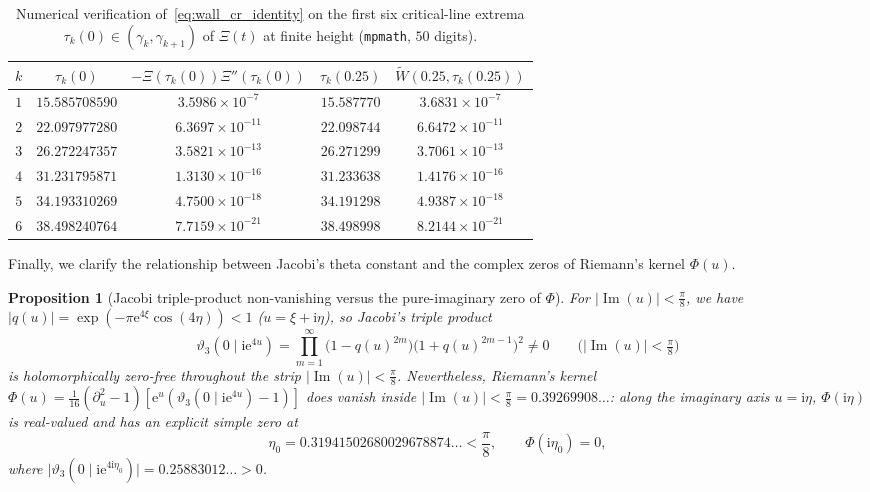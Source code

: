 \documentclass[11pt,reqno]{amsart}
\theoremstyle{plain}
\newtheorem{proposition}[theorem]{Proposition}
\theoremstyle{definition}
\theoremstyle{remark}
\numberwithin{equation}{section}
\newcommand{\ii}{\mathrm{i}}
\newcommand{\ee}{\mathrm{e}}
\DeclareMathOperator{\Imop}{Im}
\begin{document}
\begin{table}[htbp]
\centering
\caption{Numerical verification of~\eqref{eq:wall_cr_identity} on the first six critical-line extrema $\tau_k(0) \in (\gamma_k, \gamma_{k+1})$ of $\Xi(t)$ at finite height (\texttt{mpmath}, $50$ digits).}\label{tab:walls}
\small
\begin{tabular}{@{}ccccc@{}}
\toprule
$k$ & $\tau_k(0)$ & $-\Xi(\tau_k(0))\Xi''(\tau_k(0))$ & $\tau_k(0.25)$ & $\widetilde{W}(0.25, \tau_k(0.25))$ \\
\midrule
$1$ & $15.585708590$ & $3.5986 \times 10^{-7}$  & $15.587770$ & $3.6831 \times 10^{-7}$ \\
$2$ & $22.097977280$ & $6.3697 \times 10^{-11}$ & $22.098744$ & $6.6472 \times 10^{-11}$ \\
$3$ & $26.272247357$ & $3.5821 \times 10^{-13}$ & $26.271299$ & $3.7061 \times 10^{-13}$ \\
$4$ & $31.231795871$ & $1.3130 \times 10^{-16}$ & $31.233638$ & $1.4176 \times 10^{-16}$ \\
$5$ & $34.193310269$ & $4.7500 \times 10^{-18}$ & $34.191298$ & $4.9387 \times 10^{-18}$ \\
$6$ & $38.498240764$ & $7.7159 \times 10^{-21}$ & $38.498998$ & $8.2144 \times 10^{-21}$ \\
\bottomrule
\end{tabular}
\end{table}

Finally, we clarify the relationship between Jacobi's theta constant and the complex zeros of Riemann's kernel $\Phi(u)$.

\begin{proposition}[Jacobi triple-product non-vanishing versus the pure-imaginary zero of $\Phi$]\label{prop:phi_zero}
For $\lvert\Imop(u)\rvert < \frac{\pi}{8}$, we have $\lvert q(u)\rvert = \exp(-\pi\ee^{4\xi}\cos(4\eta)) < 1$ ($u = \xi + \ii\eta$), so Jacobi's triple product~\cite{jacobi1829}
\begin{equation}\label{eq:jacobi_triple}
\vartheta_3(0 \mid \ii\ee^{4u}) = \prod_{m=1}^{\infty}\bigl(1 - q(u)^{2m}\bigr)\bigl(1 + q(u)^{2m-1}\bigr)^2 \neq 0 \qquad \bigl(\lvert\Imop(u)\rvert < \tfrac{\pi}{8}\bigr)
\end{equation}
is holomorphically zero-free throughout the strip $\lvert\Imop(u)\rvert < \frac{\pi}{8}$. Nevertheless, Riemann's kernel $\Phi(u) = \frac{1}{16}(\partial_u^2 - 1)[\ee^u(\vartheta_3(0 \mid \ii\ee^{4u}) - 1)]$ \emph{does} vanish inside $\lvert\Imop(u)\rvert < \frac{\pi}{8} = 0.39269908\dots$: along the imaginary axis $u = \ii\eta$, $\Phi(\ii\eta)$ is real-valued and has an explicit simple zero at
\begin{equation}\label{eq:eta0_zero}
\eta_0 = 0.31941502680029678874\dots < \frac{\pi}{8}, \qquad \Phi(\ii\eta_0) = 0,
\end{equation}
where $\lvert\vartheta_3(0 \mid \ii\ee^{4\ii\eta_0})\rvert = 0.25883012\dots > 0$.
\end{proposition}
\end{document}
